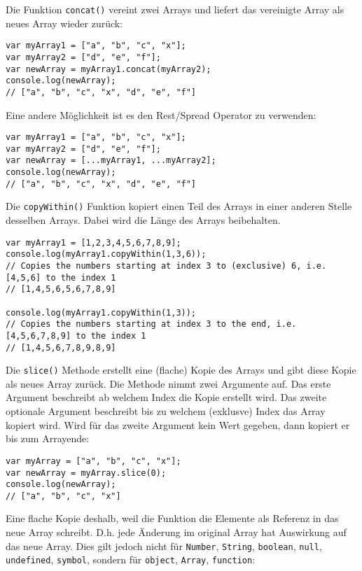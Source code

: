 \documentclass{book}
\begin{document}
Die Funktion \lstinline|concat()| vereint zwei Arrays und liefert das vereinigte Array als neues Array wieder zurück:
\begin{lstlisting}[caption=Array Konstruktor]
var myArray1 = ["a", "b", "c", "x"];
var myArray2 = ["d", "e", "f"];
var newArray = myArray1.concat(myArray2);
console.log(newArray);
// ["a", "b", "c", "x", "d", "e", "f"]
\end{lstlisting}

Eine andere Möglichkeit ist es den Rest/Spread Operator zu verwenden:
\begin{lstlisting}[caption=Array Konstruktor]
var myArray1 = ["a", "b", "c", "x"];
var myArray2 = ["d", "e", "f"];
var newArray = [...myArray1, ...myArray2];
console.log(newArray);
// ["a", "b", "c", "x", "d", "e", "f"]
\end{lstlisting}

Die \lstinline|copyWithin()| Funktion kopiert einen Teil des Arrays in einer anderen Stelle desselben Arrays. Dabei wird die Länge des Arrays beibehalten. 

\begin{lstlisting}[caption=Array Konstruktor]
var myArray1 = [1,2,3,4,5,6,7,8,9];
console.log(myArray1.copyWithin(1,3,6));
// Copies the numbers starting at index 3 to (exclusive) 6, i.e. [4,5,6] to the index 1
// [1,4,5,6,5,6,7,8,9]

console.log(myArray1.copyWithin(1,3));
// Copies the numbers starting at index 3 to the end, i.e. [4,5,6,7,8,9] to the index 1
// [1,4,5,6,7,8,9,8,9]
\end{lstlisting}

Die \lstinline|slice()| Methode erstellt eine (flache) Kopie des Arrays und gibt diese Kopie als neues Array zurück. Die Methode nimmt zwei Argumente auf. Das erste Argument beschreibt ab welchem Index die Kopie erstellt wird. Das zweite optionale Argument beschreibt bis zu welchem (exklusve) Index das Array kopiert wird. Wird für das zweite Argument kein Wert gegeben, dann kopiert er bis zum Arrayende:

\begin{lstlisting}[caption=Array Konstruktor]
var myArray = ["a", "b", "c", "x"];
var newArray = myArray.slice(0);
console.log(newArray);
// ["a", "b", "c", "x"]
\end{lstlisting}

Eine flache Kopie deshalb, weil die Funktion die Elemente als Referenz in das neue Array schreibt. D.h. jede Änderung im original Array hat Auswirkung auf das neue Array. Dies gilt jedoch nicht für \lstinline|Number|, \lstinline|String|, \lstinline|boolean|, \lstinline|null|, \lstinline|undefined|, \lstinline|symbol|, sondern für \lstinline|object|, \lstinline|Array|, \lstinline|function|:
\end{document}
